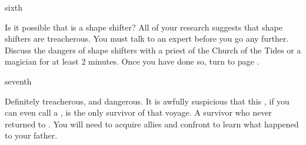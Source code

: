 \documentclass[greennotebook]{NeptuneBall}
\begin{document}
\begin{page}{sixth}

Is it possible that \cGeneral{} is a shape shifter? All of your research suggests that shape shifters are treacherous. You must talk to an expert before you go any further. Discuss the dangers of shape shifters with a priest of the Church of the Tides or a magician for at least 2 minutes. Once you have done so, turn to page .

\end{page}

\begin{page}{seventh}

Definitely treacherous, and dangerous. It is awfully suspicious that this \cGeneral{\human}, if you can even call \cGeneral{\them} a \cGeneral{\human}, is the only survivor of that voyage. A survivor who never returned to \pAmerica{}. You will need to acquire allies and confront \cGeneral{\them} to learn what happened to your father.

\end{page}

\endnotebook
\end{document}
